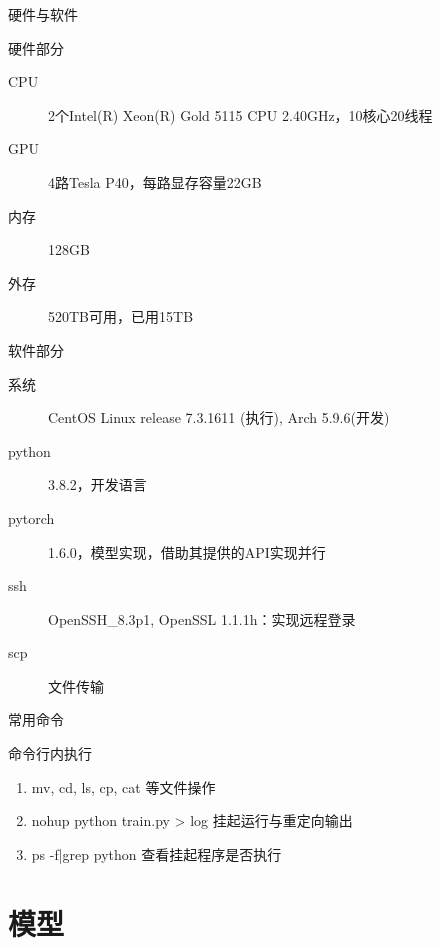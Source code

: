 \documentclass[algorithm,pgfplots]{cuzbeamer}
\begin{document}
    \begin{frame}{硬件与软件}
        \begin{exampleblock}{硬件部分}
            \begin{description}
                \item[{\ttfamily CPU}] 2个Intel(R) Xeon(R) Gold 5115 CPU \@ 2.40GHz，10核心20线程
                \item[{\ttfamily GPU}] 4路Tesla P40，每路显存容量22GB
                \item[内存] 128GB
                \item[外存] 520TB可用，已用15TB
            \end{description}
        \end{exampleblock}
        \begin{exampleblock}{软件部分}
            \begin{description}
                \item[系统] CentOS Linux release 7.3.1611 (执行), Arch 5.9.6(开发)
                \item[{\ttfamily python}] 3.8.2，开发语言
                \item[{\ttfamily pytorch}] 1.6.0，模型实现，借助其提供的API实现并行
                \item[{\ttfamily ssh}] OpenSSH\_8.3p1, OpenSSL 1.1.1h：实现远程登录
                \item[{\ttfamily scp}] 文件传输
            \end{description}
        \end{exampleblock}
    \end{frame}

    \begin{frame}{常用命令}
        \begin{alertblock}{命令行内执行}
            \begin{enumerate}
                \item {\ttfamily mv, cd, ls, cp, cat} 等文件操作
                \item {\ttfamily nohup python train.py > log} 挂起运行与重定向输出
                \item {\ttfamily ps -f|grep python} 查看挂起程序是否执行
            \end{enumerate}
        \end{alertblock}
    \end{frame}

    \section{模型}
\end{document}
